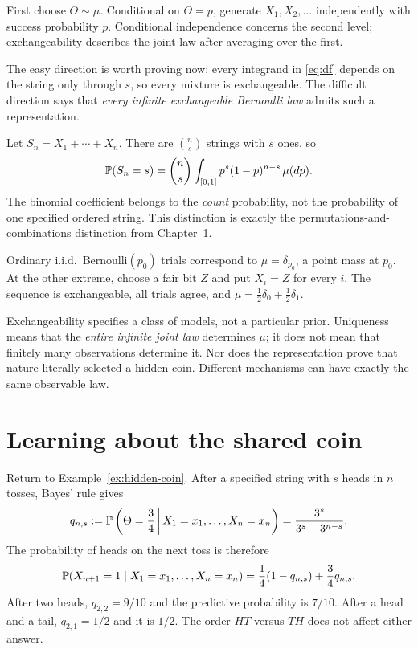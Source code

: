 \begin{bigidea}[title={Two levels of randomness}]
First choose $\Theta\sim\mu$. Conditional on $\Theta=p$, generate $X_1,X_2,\ldots$ independently with success probability $p$. Conditional independence concerns the second level; exchangeability describes the joint law after averaging over the first.
\end{bigidea}

The easy direction is worth proving now: every integrand in \eqref{eq:df} depends on the string only through $s$, so every mixture is exchangeable. The difficult direction says that \emph{every infinite exchangeable Bernoulli law} admits such a representation.

Let $S_n=X_1+\cdots+X_n$. There are $\binom ns$ strings with $s$ ones, so
\begin{equation}\label{eq:df-count}
\P(S_n=s)=\binom ns\int_{[0,1]}p^s(1-p)^{n-s}\,\mu(dp).
\end{equation}
The binomial coefficient belongs to the \emph{count} probability, not the probability of one specified ordered string. This distinction is exactly the permutations-and-combinations distinction from Chapter~1.

Ordinary i.i.d.\ Bernoulli$(p_0)$ trials correspond to $\mu=\delta_{p_0}$, a point mass at $p_0$. At the other extreme, choose a fair bit $Z$ and put $X_i=Z$ for every $i$. The sequence is exchangeable, all trials agree, and $\mu=\tfrac12\delta_0+\tfrac12\delta_1$.

\begin{warningbox}[title={What the theorem does not choose}]
Exchangeability specifies a class of models, not a particular prior. Uniqueness means that the \emph{entire infinite joint law} determines $\mu$; it does not mean that finitely many observations determine it. Nor does the representation prove that nature literally selected a hidden coin. Different mechanisms can have exactly the same observable law.
\end{warningbox}

\section{Learning about the shared coin}

Return to Example~\ref{ex:hidden-coin}. After a specified string with $s$ heads in $n$ tosses, Bayes' rule gives
\[
q_{n,s}:=\P\left(\Theta=\frac34\given X_1=x_1,\ldots,X_n=x_n\right)
=\frac{3^s}{3^s+3^{n-s}}.
\]
The probability of heads on the next toss is therefore
\[
\P(X_{n+1}=1\mid X_1=x_1,\ldots,X_n=x_n)
=\frac14(1-q_{n,s})+\frac34 q_{n,s}.
\]
After two heads, $q_{2,2}=9/10$ and the predictive probability is $7/10$. After a head and a tail, $q_{2,1}=1/2$ and it is $1/2$. The order $HT$ versus $TH$ does not affect either answer.

